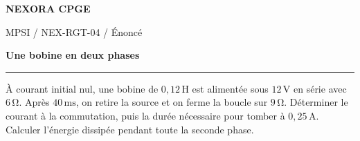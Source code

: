 \documentclass[11pt,a4paper]{article}
\begin{document}
{\small\bfseries\color{nexorablue} NEXORA CPGE}\par
{\small MPSI / NEX-RGT-04 / Énoncé}\par
{\LARGE\bfseries Une bobine en deux phases}\par
\vspace{0.25em}\hrule\vspace{0.6em}

À courant initial nul, une bobine de $0{,}12\,\mathrm H$ est alimentée sous $12\,\mathrm V$ en série avec $6\,\mathrm\Omega$. Après $40\,\mathrm{ms}$, on retire la source et on ferme la boucle sur $9\,\mathrm\Omega$. Déterminer le courant à la commutation, puis la durée nécessaire pour tomber à $0{,}25\,\mathrm A$. Calculer l’énergie dissipée pendant toute la seconde phase.
\end{document}

